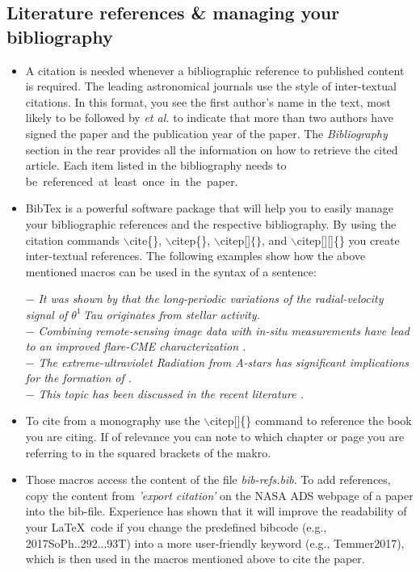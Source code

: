 \subsection*{Literature references \& managing your bibliography}
\begin{itemize}
    \item A citation is needed whenever a bibliographic reference to published content is required. The leading astronomical journals use the style of inter-textual citations. In this format, you see the first author's name in the text, most likely to be followed by \textit{et al.} to indicate that more than two authors have signed the paper and the publication year of the paper. The \textit{Bibliography} section in the rear provides all the information on how to retrieve the cited article. Each item listed in the bibliography needs to \hbox{be referenced at least once in the paper.}
    
    \item BibTex is a powerful software package that will help you to easily manage your bibliographic references and the respective bibliography. By using the citation commands 
    $\backslash$cite\{\}, 
    $\backslash$citep\{\}, 
    $\backslash$citep[]$\{\}$, and 
    $\backslash$citep[][]\{\} you create inter-textual references. The following examples show how the above mentioned macros can be used in the syntax of a sentence: 


    
     $-$ \textit{It was shown by \cite{Beck2015} that the long-periodic variations of the radial-velocity signal of $\theta^1$\,Tau originates from stellar activity.} \\
     $-$ \textit{Combining remote-sensing image data with in-situ measurements have lead to an improved flare-CME characterization 
     \citep{Temmer2017}.}\\
     $-$ \textit{The extreme-ultraviolet Radiation from A-stars has significant implications for the formation of \citep[and references therein]{Fossati2018}.}\\
     $-$ \textit{This topic has been discussed in the recent literature
    \citep[e.g. see][and references therein]{Hanslmeier2018phsabook,Veronig2020}.}
    
    \item To cite from a monography use the $\backslash$citep[]\{\} command to reference the book you are citing. If of relevance you can note to which chapter or page you are referring to in the squared brackets of the makro.

    \item Those macros access the content of the file \textit{bib-refs.bib}. To add references, copy the content from \textit{'export citation'} on the NASA ADS webpage of a paper into the bib-file. Experience has shown that it will improve the readability of your  \LaTeX\ code if you change the predefined bibcode (e.g., 2017SoPh..292...93T) into a more user-friendly keyword (e.g., Temmer2017), which is then used in the macros mentioned above to cite the paper.

\end{itemize}

